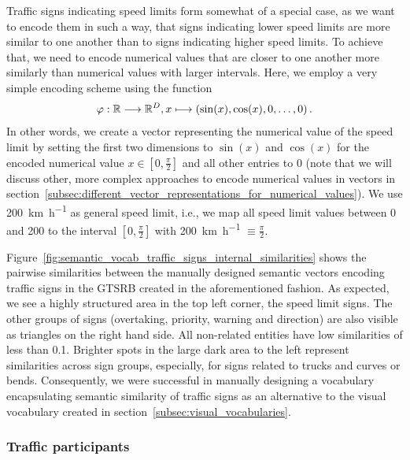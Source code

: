 Traffic signs indicating speed limits form somewhat of a special case, as we want to encode them in such a way, that signs indicating lower speed limits are more similar to one another than to signs indicating higher speed limits.
To achieve that, we need to encode numerical values that are closer to one another more similarly than numerical values with larger intervals.
Here, we employ a very simple encoding scheme using the function 
\begin{equation}
\label{eq:cosin_vec_func}
\varphi: \mathbb{R} \longrightarrow \mathbb{R}^{D}, x \longmapsto \left(\sin(x), \cos(x), 0, \ldots, 0\right).
\end{equation}
In other words, we create a vector representing the numerical value of the speed limit by setting the first two dimensions to $\sin(x)$ and $\cos(x)$ for the encoded numerical value $x \in [0,\frac{\pi}{2}]$ and all other entries to \num{0} (note that we will discuss other, more complex approaches to encode numerical values in vectors in section~\ref{subsec:different_vector_representations_for_numerical_values}).
We use \SI[per-mode=symbol]{200}{\kilo\meter\per\hour} as general speed limit, i.e., we map all speed limit values between \num{0} and \num{200} to the interval $\left[0, \frac{\pi}{2}\right]$ with \SI[per-mode=symbol]{200}{\kilo\meter\per\hour} $\equiv \frac{\pi}{2}$.

Figure~\ref{fig:semantic_vocab_traffic_signs_internal_similarities} shows the pairwise similarities between the manually designed semantic vectors encoding traffic signs in the \ac{GTSRB} created in the aforementioned fashion.
As expected, we see a highly structured area in the top left corner, the speed limit signs.
The other groups of signs (overtaking, priority, warning and direction) are also visible as triangles on the right hand side.
All non-related entities have low similarities of less than \num{0.1}.
Brighter spots in the large dark area to the left represent similarities across sign groups, especially, for signs related to trucks and curves or bends.
Consequently, we were successful in manually designing a vocabulary encapsulating semantic similarity of traffic signs as an alternative to the visual vocabulary created in section~\ref{subsec:visual_vocabularies}.

\subsubsection{Traffic participants}%
\label{ssubsec:traffic_participants}


